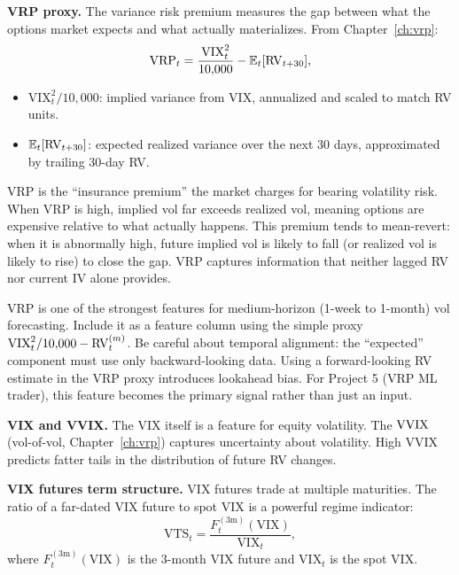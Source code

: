 \textbf{VRP proxy.}
The variance risk premium measures the gap between what the options market expects and what actually materializes. From Chapter~\ref{ch:vrp}:
\begin{equation}\label{eq:vrp-feat}
\operatorname{VRP}_t = \frac{\text{VIX}_t^2}{10{,}000} - \mathbb{E}_t[\operatorname{RV}_{t+30}],
\end{equation}
\begin{itemize}[nosep]
  \item $\text{VIX}_t^2 / 10{,}000$: implied variance from VIX, annualized and scaled to match RV units.
  \item $\mathbb{E}_t[\operatorname{RV}_{t+30}]$: expected realized variance over the next 30 days, approximated by trailing 30-day RV.
\end{itemize}

\begin{intuition}
VRP is the ``insurance premium'' the market charges for bearing volatility risk. When VRP is high, implied vol far exceeds realized vol, meaning options are expensive relative to what actually happens. This premium tends to mean-revert: when it is abnormally high, future implied vol is likely to fall (or realized vol is likely to rise) to close the gap. VRP captures information that neither lagged RV nor current IV alone provides.
\end{intuition}

\begin{projectconnection}
VRP is one of the strongest features for medium-horizon (1-week to 1-month) vol forecasting. Include it as a feature column using the simple proxy $\text{VIX}_t^2/10{,}000 - \operatorname{RV}_t^{(m)}$. Be careful about temporal alignment: the ``expected'' component must use only backward-looking data. Using a forward-looking RV estimate in the VRP proxy introduces lookahead bias. For Project 5 (VRP ML trader), this feature becomes the primary signal rather than just an input.
\end{projectconnection}

\textbf{VIX and VVIX.}
The VIX itself is a feature for equity volatility.
The $\operatorname{VVIX}$ (vol-of-vol, Chapter~\ref{ch:vrp}) captures uncertainty about volatility.
High VVIX predicts fatter tails in the distribution of future RV changes.

\textbf{VIX futures term structure.}
VIX futures trade at multiple maturities.
The ratio of a far-dated VIX future to spot VIX is a powerful regime indicator:
\begin{equation}\label{eq:vix-ts-ratio}
\text{VTS}_t = \frac{F_t^{(3\text{m})}(\text{VIX})}{\text{VIX}_t},
\end{equation}
where $F_t^{(3\text{m})}(\text{VIX})$ is the 3-month VIX future and $\text{VIX}_t$ is the spot VIX.

